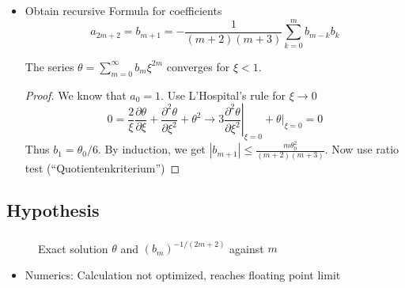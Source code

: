 \begin{frame}
	\begin{itemize}[<+->]
		\item Obtain recursive Formula for coefficients
		\begin{equation}
			a_{2m+2}=b_{m+1}= -\frac{1}{(m+2)(m+3)}\sum\limits_{k=0}^mb_{m-k}b_k
		\end{equation}
		\begin{theorem}
			The series $\theta=\sum\limits_{m=0}^\infty b_{m}\xi^{2m}$ converges for $\xi<1$. %
		\end{theorem}
		\begin{proof}
			We know that $a_0=1$. Use L'Hospital's rule for $\xi\rightarrow0$
			\begin{equation}
				0=\frac{2}{\xi}\frac{\partial\theta}{\partial\xi} + \frac{\partial^2\theta}{\partial\xi^2}+\theta^2\longrightarrow3\left.\frac{\partial^2\theta}{\partial\xi^2}\right|_{\xi=0}+\left.\theta\right|_{\xi=0}=0
			\end{equation}
			Thus $b_1=\theta_0/6$. By induction, we get $|b_{m+1}|\leq\frac{m\theta_0^2}{(m+2)(m+3)}$. Now use ratio test (``Quotientenkriterium'')
		\end{proof}
	\end{itemize}
\end{frame}

\subsection{Hypothesis}
\begin{frame}
	\frametitle{\insertsubsection}
	\begin{figure}
		\caption{Exact solution $\theta$ and $(b_m)^{-1/(2m+2)}$ against $m$}
	\end{figure}
	\begin{itemize}[<+->]
		\begin{hypothesis}
			The radius of convergence $R$ of the above calculated series is larger than $1$ and the value $\xi_0$ at which $\theta(\xi_0)=0$ is larger than $R$.
		\end{hypothesis}
		\item Numerics: Calculation not optimized, reaches floating point limit
	\end{itemize}
\end{frame}


